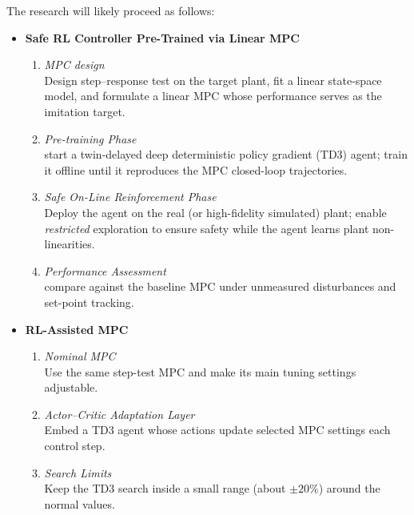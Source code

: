 \ResearchPlan

The research will likely proceed as follows:

\begin{itemize}
    \item \textbf{Safe RL Controller Pre-Trained via Linear MPC}
        \begin{enumerate}
            \item \textit{MPC design}\\
                  Design step–response test on the target plant, fit a linear state-space model, and formulate a linear MPC whose performance serves as the imitation target.  
            \item \textit{Pre-training Phase}\\
                  start a twin-delayed deep deterministic policy gradient (TD3) agent; train it offline until it reproduces the MPC closed-loop trajectories.
            \item \textit{Safe On-Line Reinforcement Phase}\\
                  Deploy the agent on the real (or high-fidelity simulated) plant; enable \emph{restricted} exploration to ensure safety while the agent learns plant non-linearities.  
            \item \textit{Performance Assessment}\\
                  compare against the baseline MPC under unmeasured disturbances and set-point tracking.
        \end{enumerate}
    \item \textbf{RL-Assisted MPC}
        \begin{enumerate}
            \item \textit{Nominal MPC}\\
                  Use the same step-test MPC and make its main tuning settings adjustable.  
            \item \textit{Actor–Critic Adaptation Layer}\\
                  Embed a TD3 agent whose actions update selected MPC settings each control step. 
            \item \textit{Search Limits}\\
                  Keep the TD3 search inside a small range (about $\pm20\%$) around the normal values.  

\end{enumerate}
\end{itemize}
